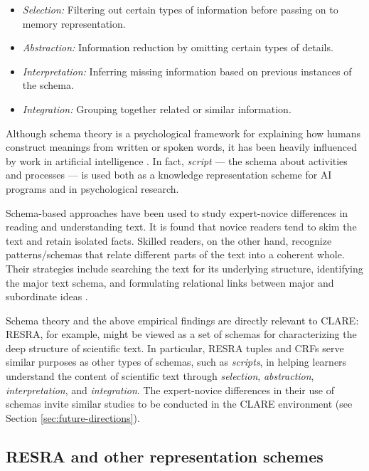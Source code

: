 \begin{itemize}
\item {\it Selection:\/} Filtering out certain types of information before
  passing on to memory representation.
  
\item {\it Abstraction:\/} Information reduction by omitting certain
  types of details.
  
\item {\it Interpretation:\/} Inferring missing information based on
  previous instances of the schema.
  
\item {\it Integration:\/} Grouping together related or similar
  information.
\end{itemize}

Although schema theory is a psychological framework for explaining how
humans construct meanings from written or spoken words, it has been heavily
influenced by work in artificial intelligence \cite{Abelson81,Schank77}. In
fact, {\it script\/} --- the schema about activities and processes --- is
used both as a knowledge representation scheme for AI programs and in
psychological research.

Schema-based approaches have been used to study expert-novice differences
in reading and understanding text. It is found that novice readers tend to
skim the text and retain isolated facts. Skilled readers, on the other
hand, recognize patterns/schemas that relate different parts of the text
into a coherent whole. Their strategies include searching the text for its
underlying structure, identifying the major text schema, and formulating
relational links between major and subordinate ideas \cite{Dijk83,Voss83}.

Schema theory and the above empirical findings are directly relevant to
CLARE: RESRA, for example, might be viewed as a set of schemas for
characterizing the deep structure of scientific text. In particular, RESRA
tuples and CRFs serve similar purposes as other types of schemas, such as
{\it scripts\/}, in helping learners understand the content of scientific
text through {\it selection\/}, {\it abstraction\/}, {\it
interpretation\/}, and {\it integration\/}. The expert-novice differences
in their use of schemas invite similar studies to be conducted in the CLARE
environment (see Section \ref{sec:future-directions}).


\subsection{RESRA and other representation schemes}
\label{sec:kr-schemes}

